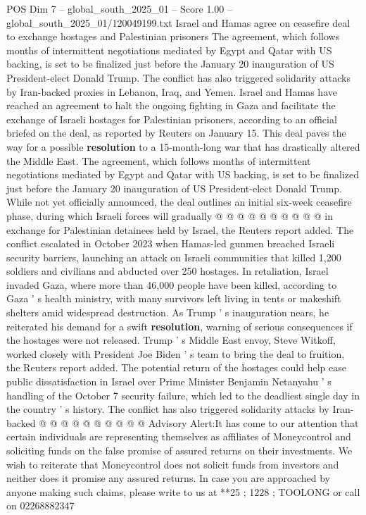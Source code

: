 \begin{textsample}{POS Dim 7 – global\_south\_2025\_01 – Score 1.00 – global\_south\_2025\_01/120049199.txt}  \label{ex:f7_pos_259}
Israel and Hamas agree on ceasefire deal to exchange hostages and Palestinian prisoners The agreement, which follows months of intermittent negotiations mediated by Egypt and Qatar with US backing, is set to be finalized just before the January 20 inauguration of US President-elect Donald Trump.
The conflict has also triggered solidarity attacks by Iran-backed proxies in Lebanon, Iraq, and Yemen.
Israel and Hamas have reached an agreement to halt the ongoing fighting in Gaza and facilitate the exchange of Israeli hostages for Palestinian prisoners, according to an official briefed on the deal, as reported by Reuters on January 15.
This deal paves the way for a possible \textbf{resolution} to a 15-month-long war that has drastically altered the Middle East.
The agreement, which follows months of intermittent negotiations mediated by Egypt and Qatar with US backing, is set to be finalized just before the January 20 inauguration of US President-elect Donald Trump.
While not yet officially announced, the deal outlines an initial six-week ceasefire phase, during which Israeli forces will gradually @ @ @ @ @ @ @ @ @ @ in exchange for Palestinian detainees held by Israel, the Reuters report added.
The conflict escalated in October 2023 when Hamas-led gunmen breached Israeli security barriers, launching an attack on Israeli communities that killed 1,200 soldiers and civilians and abducted over 250 hostages.
In retaliation, Israel invaded Gaza, where more than 46,000 people have been killed, according to Gaza ' s health ministry, with many survivors left living in tents or makeshift shelters amid widespread destruction.
As Trump ' s inauguration nears, he reiterated his demand for a swift \textbf{resolution}, warning of serious consequences if the hostages were not released.
Trump ' s Middle East envoy, Steve Witkoff, worked closely with President Joe Biden ' s team to bring the deal to fruition, the Reuters report added.
The potential return of the hostages could help ease public dissatisfaction in Israel over Prime Minister Benjamin Netanyahu ' s handling of the October 7 security failure, which led to the deadliest single day in the country ' s history.
The conflict has also triggered solidarity attacks by Iran-backed @ @ @ @ @ @ @ @ @ @ Advisory Alert:It has come to our attention that certain individuals are representing themselves as affiliates of Moneycontrol and soliciting funds on the false promise of assured returns on their investments.
We wish to reiterate that Moneycontrol does not solicit funds from investors and neither does it promise any assured returns.
In case you are approached by anyone making such claims, please write to us at **25 ; 1228 ; TOOLONG or call on 02268882347

\end{textsample}

